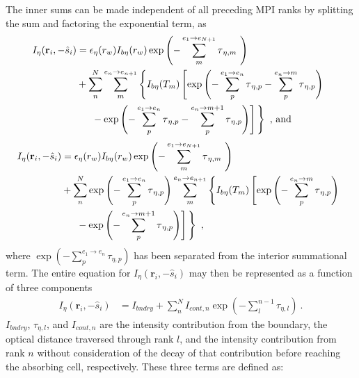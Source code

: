 The inner sums can be made independent of all preceding MPI ranks by splitting the sum and factoring the exponential term, as
\begin{equation}
    \begin{aligned}
    I_\eta{}(\textbf{r}_i,-\hat{s}_i)& = 
    \epsilon{}_\eta{}(r_w)I_{b\eta{}}(r_w)\exp{\left(-\sum_{m}^{e_1\rightarrow{}e_{N+1}}\tau{}_{\eta{},m}~\right)}\\
    &+\sum_{n}^{N}\sum_{m}^{e_n\rightarrow{}e_{n+1}}\left\{ I_{b\eta}(T_m)\left[ \exp{\left(-\sum_{p}^{e_1\rightarrow{}e_n}\tau{}_{\eta{},p}-\sum_{p}^{e_n\rightarrow{}m}\tau{}_{\eta,p}\right)}\right.{} \right.{} \\
    &\quad \left.{}\left.{} -\exp{\left(-\sum_{p}^{e_1\rightarrow{}e_n}\tau{}_{\eta{},p}-\sum_{p}^{e_n\rightarrow{}m+1}\tau{}_{\eta{},p}\right)} \vphantom{\frac12}\right] \vphantom{\frac12}\right\}~\text{, and}
    \end{aligned}
\end{equation}
\begin{equation}
    \begin{aligned}
    I_\eta{}(\textbf{r}_i,-\hat{s}_i)& = 
    \epsilon{}_\eta{}(r_w)I_{b\eta{}}(r_w)\exp{\left(-\sum_{m}^{e_1\rightarrow{}e_{N+1}}\tau{}_{\eta{},m}~\right)}\\
    &+\sum_{n}^{N}\exp\left(-\sum_{p}^{e_1\rightarrow{}e_n}\tau{}_{\eta{},p}\right)\sum_{m}^{e_n\rightarrow{}e_{n+1}}\left\{ I_{b\eta}(T_m)\left[ \exp{\left(-\sum_{p}^{e_n\rightarrow{}m}\tau{}_{\eta,p}\right)}\right.{} \right.{} \\
    &\quad \left.{}\left.{} -\exp{\left(-\sum_{p}^{e_n\rightarrow{}m+1}\tau{}_{\eta{},p}\right)} \vphantom{\frac12}\right] \vphantom{\frac12}\right\}~,
    \end{aligned}
\end{equation}
where $\exp\left(-\sum_{p}^{e_1\rightarrow{}e_n}\tau{}_{\eta{},p}\right)$ has been separated from the interior summational term. The entire equation for $I_\eta{}(\textbf{r}_i,-\hat{s}_i)$ may then be represented as a function of three components
\begin{equation}
    \begin{aligned}
    I_\eta{}(\textbf{r}_i,-\hat{s}_i)& = 
    I_{bndry}+\sum_{n}^{N}I_{cont,n}\exp\left(-\sum_l^{n-1}\tau{}_{\eta{},l}\right)~.
    \end{aligned}
    \label{eq:NewRMCRTintensity}
\end{equation}
$I_{bndry}$, $\tau{}_{\eta{},l}$, and $I_{cont,n}$ are the intensity contribution from the boundary, the optical distance traversed through rank $l$, and the intensity contribution from rank $n$ without consideration of the decay of that contribution before reaching the absorbing cell, respectively. These three terms are defined as:
